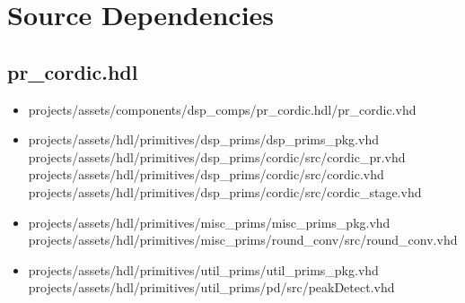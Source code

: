 \documentclass{article}
\def\comp{pr\_cordic}
\begin{document}
\newpage

\section*{Source Dependencies}
\subsection*{\comp.hdl}
\begin{itemize}
	\item projects/assets/components/dsp\_comps/pr\_cordic.hdl/pr\_cordic.vhd
	\item projects/assets/hdl/primitives/dsp\_prims/dsp\_prims\_pkg.vhd
	      \subitem projects/assets/hdl/primitives/dsp\_prims/cordic/src/cordic\_pr.vhd
	      \subitem projects/assets/hdl/primitives/dsp\_prims/cordic/src/cordic.vhd
	      \subitem projects/assets/hdl/primitives/dsp\_prims/cordic/src/cordic\_stage.vhd
	\item projects/assets/hdl/primitives/misc\_prims/misc\_prims\_pkg.vhd
	      \subitem projects/assets/hdl/primitives/misc\_prims/round\_conv/src/round\_conv.vhd
	\item projects/assets/hdl/primitives/util\_prims/util\_prims\_pkg.vhd
	      \subitem projects/assets/hdl/primitives/util\_prims/pd/src/peakDetect.vhd
\end{itemize}
\end{document}
